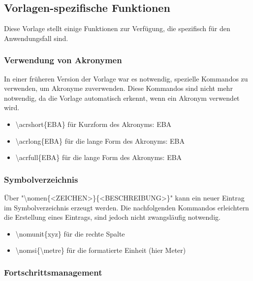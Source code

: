 \subsection{Vorlagen-spezifische Funktionen}

Diese Vorlage stellt einige Funktionen zur Verfügung, die spezifisch für den Anwendungsfall sind.


\subsubsection{Verwendung von Akronymen}

In einer früheren Version der Vorlage war es notwendig, spezielle Kommandos zu verwenden, um Akronyme zuverwenden.
Diese Kommandos sind nicht mehr notwendig, da die Vorlage automatisch erkennt, wenn ein Akronym verwendet wird.

\begin{itemize}
  \item \textbackslash{}acrshort\{EBA\} für Kurzform des Akronyms: \acrshort{EBA}
  \item \textbackslash{}acrlong\{EBA\} für die lange Form des Akronyms: \acrlong{EBA}
  \item \textbackslash{}acrfull\{EBA\} für die lange Form des Akronyms: \acrfull{EBA}
\end{itemize}

\subsubsection{Symbolverzeichnis}

Über "\textbackslash{}nomen\{<ZEICHEN>\}\{<BESCHREIBUNG>\}" kann ein neuer Eintrag im
Symbolverzeichnis erzeugt werden. Die nachfolgenden Kommandos erleichtern die Erstellung
eines Eintrags, sind jedoch nicht zwangsläufig notwendig.

\begin{itemize}
  \item \textbackslash{}nomunit\{xyz\} für die rechte Spalte
  \item \textbackslash{}nomsi\{\textbackslash{}metre\} für die formatierte Einheit (hier Meter)
\end{itemize}

\subsubsection{Fortschrittsmanagement}

